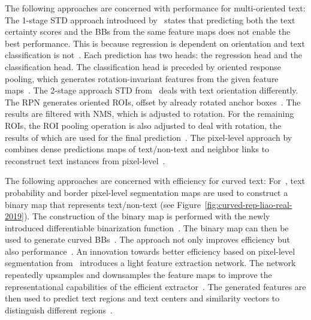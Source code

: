The following approaches are concerned with performance for multi-oriented text:
The 1-stage \ac{STD} approach introduced by~\cite{liao_rotation-sensitive_2018} states that
predicting both the text certainty scores and the \acp{BB} from the same feature maps does not
enable the best performance.
This is because regression is dependent on orientation and text classification is
not~\citep{liao_rotation-sensitive_2018}.
Each prediction has two heads: the regression head and the classification head.
The classification head is preceded by oriented response pooling, which generates rotation-invariant
features from the given feature maps~\citep{liao_rotation-sensitive_2018}.
The 2-stage approach \ac{STD} from~\cite{ma_arbitrary-oriented_2018} deals with text orientation
differently.
The \ac{RPN} generates oriented \acp{ROI}, offset by already rotated anchor
boxes~\citep{ma_arbitrary-oriented_2018}.
The results are filtered with \ac{NMS}, which is adjusted to rotation.
For the remaining \acp{ROI}, the \ac{ROI} pooling operation is also adjusted to deal with rotation,
the results of which are used for the final prediction~\citep{ma_arbitrary-oriented_2018}.
The pixel-level approach by~\cite{deng_pixellink_2018} combines dense predictions maps of
text/non-text and neighbor links to reconstruct text instances
from pixel-level~\citep{deng_pixellink_2018}.

The following approaches are concerned with efficiency for curved text:
For~\cite{liao_real-time_2019}, text probability and border pixel-level segmentation maps are used
to construct a binary map that represents text/non-text (see
Figure~\ref{fig:curved-rep-liao-real-2019}).
The construction of the binary map is performed with the newly introduced differentiable binarization
function~\citep{liao_real-time_2019}.
The binary map can then be used to generate curved \acp{BB}~\citep{liao_real-time_2019}.
The approach not only improves efficiency but also performance~\citep{liao_real-time_2019}.
An innovation towards better efficiency based on pixel-level segmentation
from~\cite{wang_efficient_2019} introduces a light feature extraction network.
The network repeatedly upsamples and downsamples the feature maps to improve the representational
capabilities of the efficient extractor~\citep{wang_efficient_2019}.
The generated features are then used to predict text regions and text centers and similarity
vectors to distinguish different regions~\citep{wang_efficient_2019}.

